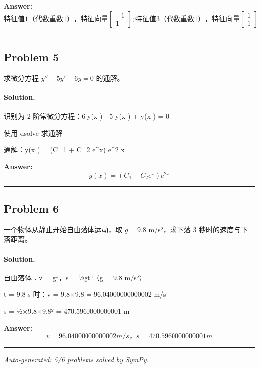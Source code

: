 \documentclass[12pt, a4paper]{article}
\newcommand{\problem}[1]{\subsection*{Problem #1}}
\newcommand{\solution}{\paragraph{Solution.}}
\begin{document}
\textbf{Answer:}
\[\boxed{特征值 1（代数重数 1），特征向量 \left[\begin{matrix}-1\\1\end{matrix}\right]; 特征值 3（代数重数 1），特征向量 \left[\begin{matrix}1\\1\end{matrix}\right]}\]

\vspace{1em}
\hrule
\vspace{1em}

\problem{5}

求微分方程 $y'' - 5y' + 6y = 0$ 的通解。

\solution

识别为 2 阶常微分方程：6 y{\left(x \right)} - 5  y{\left(x \right)} +  y{\left(x \right)} = 0

使用 dsolve 求通解

通解：y{\left(x \right)} = \left(C\_{1} + C\_{2} e^{x}\right) e^{2 x}

\textbf{Answer:}
\[\boxed{y{\left(x \right)} = \left(C_{1} + C_{2} e^{x}\right) e^{2 x}}\]

\vspace{1em}
\hrule
\vspace{1em}

\problem{6}

一个物体从静止开始自由落体运动，取 $g = 9.8$ m/s²，求下落 3 秒时的速度与下落距离。

\solution

自由落体：v = gt，s = ½gt²（g = 9.8 m/s²）

t = 9.8 s 时：v = 9.8×9.8 = 96.04000000000002 m/s

s = ½×9.8×9.8² = 470.5960000000001 m

\textbf{Answer:}
\[\boxed{v = 96.04000000000002 m/s，s = 470.5960000000001 m}\]

\vspace{1em}
\hrule
\vspace{1em}


\vspace{2em}
\noindent\textit{Auto-generated: 5/6 problems solved by SymPy.}
\end{document}
